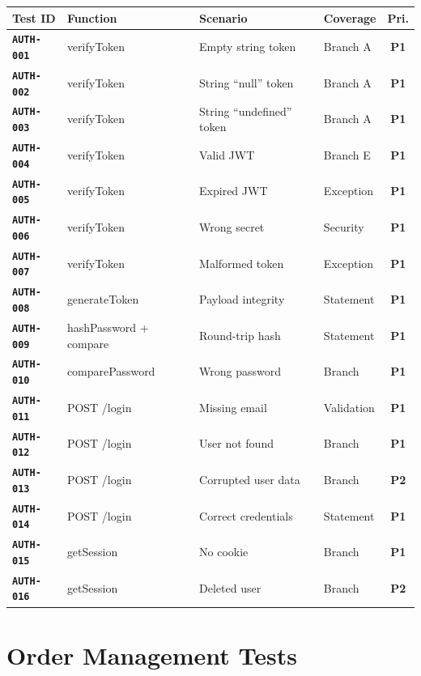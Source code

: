 \documentclass[12pt,a4paper]{report}
\newcommand{\testid}[1]{\texttt{\textbf{\color{secondary}#1}}}
\newcommand{\pone}{\textbf{\color{p1red}P1}}
\newcommand{\ptwo}{\textbf{\color{p2orange}P2}}
\begin{document}
\begin{longtable}{p{2cm}p{3.5cm}p{5cm}p{1.5cm}c}
  \toprule
  \textbf{Test ID} & \textbf{Function} & \textbf{Scenario} & \textbf{Coverage} & \textbf{Pri.} \\
  \midrule
  \endhead
  \testid{AUTH-001} & verifyToken & Empty string token & Branch A & \pone \\
  \testid{AUTH-002} & verifyToken & String ``null'' token & Branch A & \pone \\
  \testid{AUTH-003} & verifyToken & String ``undefined'' token & Branch A & \pone \\
  \testid{AUTH-004} & verifyToken & Valid JWT & Branch E & \pone \\
  \testid{AUTH-005} & verifyToken & Expired JWT & Exception & \pone \\
  \testid{AUTH-006} & verifyToken & Wrong secret & Security & \pone \\
  \testid{AUTH-007} & verifyToken & Malformed token & Exception & \pone \\
  \testid{AUTH-008} & generateToken & Payload integrity & Statement & \pone \\
  \testid{AUTH-009} & hashPassword + compare & Round-trip hash & Statement & \pone \\
  \testid{AUTH-010} & comparePassword & Wrong password & Branch & \pone \\
  \testid{AUTH-011} & POST /login & Missing email & Validation & \pone \\
  \testid{AUTH-012} & POST /login & User not found & Branch & \pone \\
  \testid{AUTH-013} & POST /login & Corrupted user data & Branch & \ptwo \\
  \testid{AUTH-014} & POST /login & Correct credentials & Statement & \pone \\
  \testid{AUTH-015} & getSession & No cookie & Branch & \pone \\
  \testid{AUTH-016} & getSession & Deleted user & Branch & \ptwo \\
  \bottomrule
\end{longtable}

\section{Order Management Tests}
\end{document}
